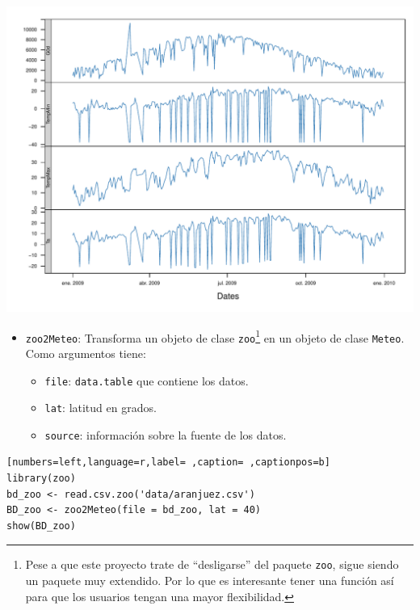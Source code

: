 \begin{center}
\includegraphics[width=\textwidth]{figuras/codigo-dt2meteo.pdf}
\end{center}
\begin{itemize}
\item \texttt{zoo2Meteo}: Transforma un objeto de clase \texttt{zoo}\footnote{Pese a que este proyecto trate de ``desligarse'' del paquete \texttt{zoo}, sigue siendo un paquete muy extendido. Por lo que es interesante tener una función así para que los usuarios tengan una mayor flexibilidad.} en un objeto de clase \texttt{Meteo}.
Como argumentos tiene:
\begin{itemize}
\item \texttt{file}: \texttt{data.table} que contiene los datos.
\item \texttt{lat}: latitud en grados.
\item \texttt{source}: información sobre la fuente de los datos.
\end{itemize}
\end{itemize}
\begin{lstlisting}[numbers=left,language=r,label= ,caption= ,captionpos=b]
library(zoo)
bd_zoo <- read.csv.zoo('data/aranjuez.csv')
BD_zoo <- zoo2Meteo(file = bd_zoo, lat = 40)
show(BD_zoo)
\end{lstlisting}

